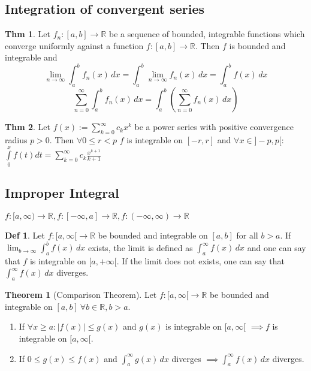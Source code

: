 \documentclass[a4paper, 10pt]{article}
\theoremstyle{definition}
\newtheorem*{theorem}{Thm}
\newtheorem*{definition}{Def}
\theoremstyle{ex}
\theoremstyle{named}
\newtheorem*{ntheorem_wrapper}{Theorem}
\newenvironment{ntheorem}%
    {\begin{mdframed}[style=important]\begin{ntheorem_wrapper}}%
    {\end{ntheorem_wrapper}\end{mdframed}}
\newcommand{\R}{\mathbb{R}}
\begin{document}
\subsection{Integration of convergent series}
\begin{theorem}
    Let $f_n: [a, b] \to \R$ be a sequence of bounded, integrable functions which converge uniformly against a function $f: [a, b] \to \R$. Then $f$ is bounded and integrable and
    $$\lim_{n \to \infty} \int_a^b f_n(x) \,dx = \int_a^b \lim_{n \to \infty}  f_n(x) \,dx = \int_a^b f(x) \,dx$$
    $$\sum_{n=0}^\infty \int_a^b f_n(x)\,dx = \int_a^b\left(\sum_{n=0}^\infty f_n(x)\,dx\right)$$
\end{theorem}

\begin{theorem}
    Let $f(x) := \sum_{k=0}^\infty c_k x^k$ be a power series with positive convergence radius $p > 0$. Then $\forall 0 \leq r < p$ $f$ is integrable on $[-r, r]$ and $\forall x \in ]-p, p[$:
    $\int\limits_0^x f(t) dt = \sum\limits_{k=0}^\infty c_k \frac{x^{k + 1}}{k + 1}$
\end{theorem}

\subsection{Improper Integral}
\begin{center}
    $f: [a, \infty) \to \R, f: [-\infty, a] \to \R, f: (-\infty, \infty) \to \R$
\end{center}

\begin{definition}
    Let $f: [a, \infty[ \to \R$ be bounded and integrable on $[a, b]$ for all $b > a$. If $\lim_{b \to \infty} \int_a^b f(x) \,dx$ exists, the limit is defined as $\int_a^\infty f(x) \,dx$ and one can say that $f$ is integrable on $[a, +\infty[$. If the limit does not exists, one can say that $\int_a^\infty f(x) \,dx$ diverges.
\end{definition}

\begin{ntheorem}[Comparison Theorem]
    Let $f: [a, \infty[ \to \R$ be bounded and integrable on $[a, b] \ \forall b \in \R, b > a$.
    \begin{enumerate}
        \item If $\forall x \geq a : |f(x)| \leq g(x)$ and $g(x)$ is integrable on $[a, \infty[$ $\implies f$ is integrable on $[a, \infty[$.
        \item If $0 \leq g(x) \leq f(x)$ and $\int_a^\infty g(x) \,dx$ diverges $\implies \int_a^\infty f(x) \,dx$ diverges.
    \end{enumerate}
\end{ntheorem}
\end{document}
